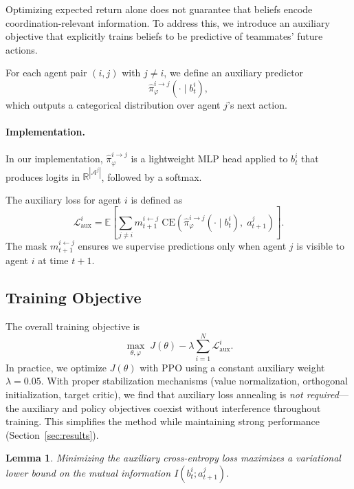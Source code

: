 \documentclass{article}
\theoremstyle{plain}
\newtheorem{lemma}[theorem]{Lemma}
\theoremstyle{definition}
\theoremstyle{remark}
\begin{document}
Optimizing expected return alone does not guarantee that beliefs encode coordination-relevant information. To address this, we introduce an auxiliary objective that explicitly trains beliefs to be predictive of teammates’ future actions.

For each agent pair $(i,j)$ with $j \neq i$, we define an auxiliary predictor
\begin{equation}
\hat{\pi}_\varphi^{i \rightarrow j}(\cdot \mid b_t^i),
\end{equation}
which outputs a categorical distribution over agent $j$'s next action.

\paragraph{Implementation.}
In our implementation, $\hat{\pi}_\varphi^{i\rightarrow j}$ is a lightweight MLP head applied to $b_t^i$ that produces logits in $\mathbb{R}^{|\mathcal{A}^j|}$, followed by a softmax.

The auxiliary loss for agent $i$ is defined as
\begin{equation}
\mathcal{L}_{\mathrm{aux}}^i
=
\mathbb{E}\left[
\sum_{j \neq i}
m_{t+1}^{i \leftarrow j}
\;
\mathrm{CE}\!\left(
\hat{\pi}_\varphi^{i \rightarrow j}(\cdot \mid b_t^i),
\;
a_{t+1}^j
\right)
\right].
\end{equation}
The mask $m_{t+1}^{i\leftarrow j}$ ensures we supervise predictions only when agent $j$ is visible to agent $i$ at time $t{+}1$.

\subsection{Training Objective}

The overall training objective is
\begin{equation}
\max_{\theta,\varphi}
\;
J(\theta)
-
\lambda
\sum_{i=1}^N
\mathcal{L}_{\mathrm{aux}}^i.
\end{equation}
In practice, we optimize $J(\theta)$ with PPO using a constant auxiliary weight $\lambda = 0.05$. With proper stabilization mechanisms (value normalization, orthogonal initialization, target critic), we find that auxiliary loss annealing is \emph{not required}---the auxiliary and policy objectives coexist without interference throughout training. This simplifies the method while maintaining strong performance (Section~\ref{sec:results}).

\begin{lemma}
Minimizing the auxiliary cross-entropy loss maximizes a variational lower bound on the mutual information $I(b_t^i; a_{t+1}^j).$
\end{lemma}
\end{document}
